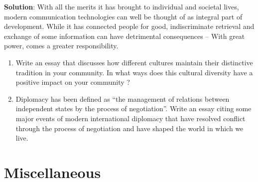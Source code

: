\documentclass[
  openany]{book}
\newenvironment{solution}{ {\bfseries Solution}:}{}
\begin{document}
\begin{solution}
With all the merits it has brought to individual and societal lives, modern communication technologies can well be thought of as integral part of development. While it has connected people for good, indiscriminate retrieval and exchange of some information can have detrimental consequences -- With great power, comes a greater responsibility.

\end{solution}

\begin{enumerate}
\def\labelenumi{\arabic{enumi}.}
\setcounter{enumi}{1}
\item
  Write an essay that discusses how different cultures maintain their distinctive tradition in your community. In what ways does this cultural diversity have a positive impact on your community ?
\item
  Diplomacy has been defined as ``the management of relations between independent states by the process of negotiation''. Write an essay citing some major events of modern international diplomacy that have resolved conflict through the process of negotiation and have shaped the world in which we live.
\end{enumerate}

\hypertarget{miscellaneous-2}{%
\section{Miscellaneous}\label{miscellaneous-2}}
\end{document}
